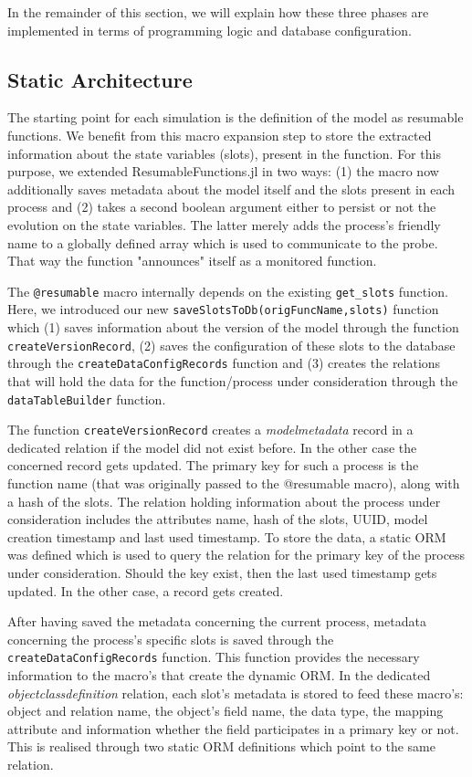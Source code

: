 \documentclass{juliacon}
\begin{document}
In the remainder of this section, we will explain how these three phases are implemented in terms of programming logic and database configuration.

\subsection{Static Architecture}\label{statArch}

The starting point for each simulation is the definition of the model as resumable functions. We benefit from this macro expansion step to store the extracted information about the state variables (slots), present in the function. For this purpose, we extended ResumableFunctions.jl in two ways: (1) the macro now additionally saves metadata about the model itself and the slots present in each process and (2) takes a second boolean argument either to persist or not the evolution on the state variables. The latter merely adds the process's friendly name to a globally defined array which is used to communicate to the probe. That way the function "announces" itself as a monitored function.\vskip 6pt

The \texttt{@resumable} macro internally depends on the existing \texttt{get\_slots} function. Here, we introduced our new \texttt{saveSlotsToDb(origFuncName,slots)} function which (1) saves information about the version of the model through the function \texttt{createVersionRecord}, (2) saves the configuration of these slots to the database through the \texttt{createDataConfigRecords} function and (3) creates the relations that will hold the data for the function/process under consideration through the \texttt{dataTableBuilder} function. \vskip 6pt

The function \texttt{createVersionRecord} creates a \textit{modelmetadata} record in a dedicated relation if the model did not exist before. In the other case the concerned record gets updated. The primary key for such a process is the function name (that was originally passed to the @resumable macro), along with a hash of the slots. The relation holding information about the process under consideration includes the attributes name, hash of the slots, UUID, model creation timestamp and last used timestamp. To store the data, a static ORM was defined which is used to query the relation for the primary key of the process under consideration. Should the key exist, then the last used timestamp gets updated. In the other case, a record gets created. \vskip 6pt

After having saved the metadata concerning the current process, metadata concerning the process's specific slots is saved through the \texttt{createDataConfigRecords} function. This function provides the necessary information to the macro's that create the dynamic ORM. In the dedicated \textit{objectclassdefinition} relation, each slot's metadata is stored to feed these macro's: object and relation name, the object's field name, the data type, the mapping attribute and information whether the field participates in a primary key or not. This is realised through two static ORM definitions which point to the same relation. \vskip 6pt
\end{document}

